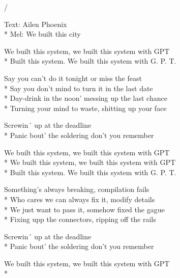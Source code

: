 /\begin{SongText}
    \begin{SongInfo}
        Text: Ailen Phoenix\\*%
        Mel: We built this city
    \end{SongInfo}
    \begin{SongVerse}
        We built this system, we built this system with GPT\\*%
        Built this system. We built this system with G. P. T.
    \end{SongVerse}
     \begin{SongVerse}
        Say you can't do it tonight or miss the feast\\*%
        Say you don't mind to turn it in the last date\\*%
        Day-drink in the noon' messing up the last chance\\*%
        Turning your mind to waste, shitting up your face
    \end{SongVerse}   
    \begin{SongVerse}
        Screwin´ up at the deadline\\*%
        Panic bout' the soldering don't you remember 
    \end{SongVerse}
    \begin{SongVerse}
        We built this system, we built this system with GPT\\*%
        We built this system, we built this system with GPT\\*%
        Built this system. We built this system with G. P. T.
    \end{SongVerse}
    \begin{SongVerse}
        Something's always breaking, compilation fails\\*%
        Who cares we can always fix it, modify details\\*%
        We just want to pass it, somehow fixed the gague\\*%
        Fixing upp the connectors, ripping off the rails        
    \end{SongVerse}
    \begin{SongVerse}
        Screwin´ up at the deadline\\*%
        Panic bout' the soldering don't you remember 
    \end{SongVerse}
    \begin{SongVerse}
        We built this system, we built this system with GPT\\*%

\end{SongVerse}
\end{SongText}
